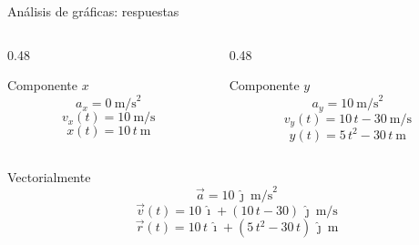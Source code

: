 \documentclass[aspectratio=169,xcolor=dvipsnames]{beamer}
\begin{document}
	\begin{frame}{Análisis de gráficas: respuestas}
		\begin{columns}[T]
			\begin{column}{0.48\textwidth}
				\begin{block}{Componente $x$}
					\[
					a_x = 0\ \text{m/s}^2
					\]
					\[
					v_x(t) = 10\ \text{m/s}
					\]
					\[
					x(t) = 10\,t\ \text{m}
					\]
				\end{block}
			\end{column}
			\begin{column}{0.48\textwidth}
				\begin{block}{Componente $y$}
					\[
					a_y = 10\ \text{m/s}^2
					\]
					\[
					v_y(t) = 10\,t - 30\ \text{m/s}
					\]
					\[
					y(t) = 5\,t^2 - 30\,t\ \text{m}
					\]
				\end{block}
			\end{column}
		\end{columns}
		
		\vspace{0.35cm}
		\begin{exampleblock}{Vectorialmente}
			\centering
			\[
			\vec{a} = 10\,\hat{\jmath}\ \text{m/s}^2
			\]
			\[
			\vec{v}(t) = 10\,\hat{\imath} + (10\,t - 30)\,\hat{\jmath}\ \text{m/s}
			\]
			\[
			\vec{r}(t) = 10\,t\,\hat{\imath} + (5\,t^2 - 30\,t)\,\hat{\jmath}\ \text{m}
			\]
		\end{exampleblock}
	\end{frame}
	
\end{document}

